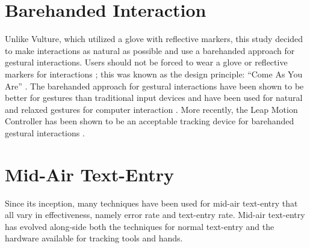 \section{Barehanded Interaction}
Unlike Vulture, which utilized a glove with reflective markers, this study decided to make interactions as natural as possible and use a barehanded approach for gestural interactions. Users should not be forced to wear a glove or reflective markers for interactions \cite{ref_natural_interactions}; this was known as the design principle: ``Come As You Are'' \cite{ref_come_as_you_are}. The barehanded approach for gestural interactions have been shown to be better for gestures than traditional input devices \cite{ref_barehanded_interaction} and have been used for natural and relaxed gestures for computer interaction \cite{ref_natural_relaxed_gestures}. More recently, the Leap Motion Controller has been shown to be an acceptable tracking device for barehanded gestural interactions \cite{ref_alvin_thesis,ref_darren_thesis,ref_leap_device_evaluation_1,ref_leap_device_evaluation_2,ref_leap_pointing_device}.

\section{Mid-Air Text-Entry}
Since its inception, many techniques have been used for mid-air text-entry that all vary in effectiveness, namely error rate and text-entry rate. Mid-air text-entry has evolved along-side both the techniques for normal text-entry and the hardware available for tracking tools and hands.

